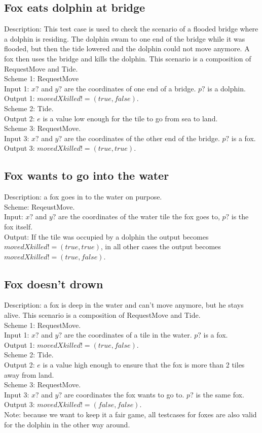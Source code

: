 \documentclass[a4paper,11pt]{article}
\begin{document}
    \subsection{Fox eats dolphin at bridge}
    Description: This test case is used to check the scenario of a flooded bridge where a dolphin is residing. The dolphin swam to one end of the bridge while it was flooded, but then the tide lowered and the dolphin could not move anymore. A fox then uses the bridge and kills the dolphin. This scenario is a composition of RequestMove and Tide.\\
    Scheme 1: RequestMove\\
    Input 1: $x?$ and $y?$ are the coordinates of one end of a bridge. $p?$ is a dolphin.\\
    Output 1: $movedXkilled! = (true,false)$.\\
    Scheme 2: Tide.\\
    Output 2: $e$ is a value low enough for the tile to go from sea to land.\\
    Scheme 3: RequestMove.\\
    Input 3: $x?$ and $y?$ are the coordinates of the other end of the bridge. $p?$ is a fox.\\
    Output 3: $movedXkilled! = (true,true)$.\\

    \subsection{Fox wants to go into the water}
    Description: a fox goes in to the water on purpose.\\
    Scheme: ReqeustMove.\\
    Input: $x?$ and $y?$ are the coordinates of the water tile the fox goes to, $p?$ is the fox itself.\\
    Output: If the tile was occupied by a dolphin the output becomes $movedXkilled! = (true,true)$, in all other cases the output becomes $movedXkilled! = (true,false)$.

    \subsection{Fox doesn't drown}
    Description: a fox is deep in the water and can't move anymore, but he stays alive. This scenario is a composition of RequestMove and Tide.\\
    Scheme 1: RequestMove.\\
    Input 1: $x?$ and $y?$ are the coordinates of a tile in the water. $p?$ is a fox.\\
    Output 1: $movedXkilled! = (true,false)$.\\
    Scheme 2: Tide.\\
    Output 2: $e$ is a value high enough to ensure that the fox is more than 2 tiles away from land.\\
    Scheme 3: RequestMove.\\
    Input 3: $x?$ and $y?$ are coordinates the fox wants to go to. $p?$ is the same fox.\\
    Output 3: $movedXkilled! = (false,false)$.\\


    Note: because we want to keep it a fair game, all testcases for foxes are also valid for the dolphin in the other way around.\\
\end{document}
